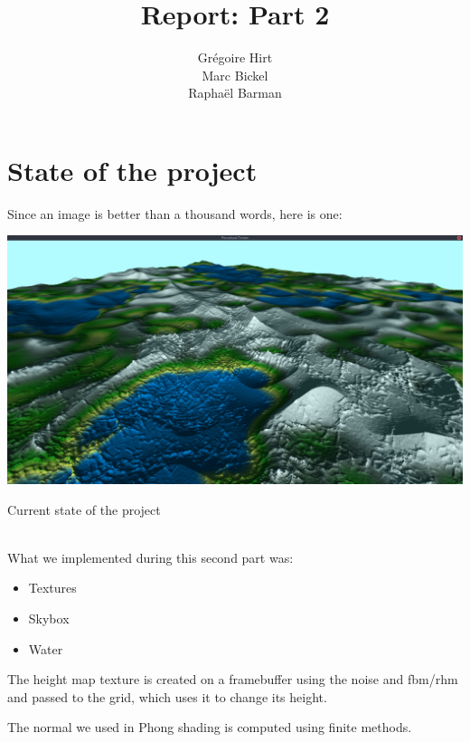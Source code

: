 \documentclass[11pt]{article}
\begin{document}
\setlength{\parindent}{0pt}
%
\author{Grégoire Hirt\\ Marc Bickel\\ Raphaël Barman}
\title{\vspace{-2.0cm}Report: Part 2}
\maketitle
\vspace{-1cm}
\section{State of the project}
Since an image is better than a thousand words, here is one:
\begin{center}
\includegraphics[width=\textwidth]{screen03}
\caption{Current state of the project}
\end{center} \\

What we implemented during this second part was:
\begin{itemize}
\item Textures
\item Skybox
\item Water
\end{itemize}
The height map texture is created on a framebuffer using the noise and fbm/rhm and passed to the grid, which
uses it to change its height.

The normal we used in Phong shading is computed using finite methods.
\end{document}
